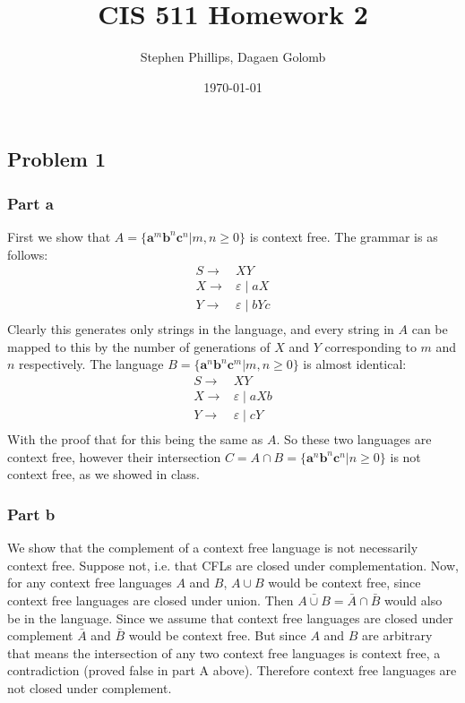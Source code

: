 \documentclass[english]{article}
\title{CIS 511 Homework 2}
\author{Stephen Phillips, Dagaen Golomb}
\date{\today }
\begin{document}
\maketitle
\subsection*{Problem 1}
\subsubsection*{Part a}
First we show that $A = \{ \mathbf{a}^m \mathbf{b}^n \mathbf{c}^n | m,n \ge 0 \}$ is context free. The grammar is as follows:
\begin{align*}
S \rightarrow & XY \\
X \rightarrow & \varepsilon \; | \; aX \\
Y \rightarrow & \varepsilon \; | \; bYc \\
\end{align*}
Clearly this generates only strings in the language, and every string in $A$ can be mapped to this by the number of generations of $X$ and $Y$ corresponding to $m$ and $n$ respectively. The language $B = \{ \mathbf{a}^n \mathbf{b}^n \mathbf{c}^m | m,n \ge 0 \}$ is almost identical:
\begin{align*}
S \rightarrow & XY \\
X \rightarrow & \varepsilon \; | \; aXb \\
Y \rightarrow & \varepsilon \; | \; cY \\
\end{align*}
With the proof that for this being the same as $A$. So these two languages are context free, however their intersection $C = A \cap B = \{ \mathbf{a}^n \mathbf{b}^n \mathbf{c}^n | n \ge 0 \}$ is not context free, as we showed in class.

\subsubsection*{Part b}
We show that the complement of a context free language is not necessarily context free. Suppose not, i.e. that CFLs are closed under complementation. Now, for any context free languages $A$ and $B$, $A \cup B$ would be context free, since context free languages are closed under union. Then $\bar{A \cup B} = \bar{A} \cap \bar{B}$ would also be in the language. Since we assume that context free languages are closed under complement $\bar{A}$ and $\bar{B}$ would be context free. But since $A$ and $B$ are arbitrary that means the intersection of any two context free languages is context free, a contradiction (proved false in part A above). Therefore context free languages are not closed under complement.
\end{document}
